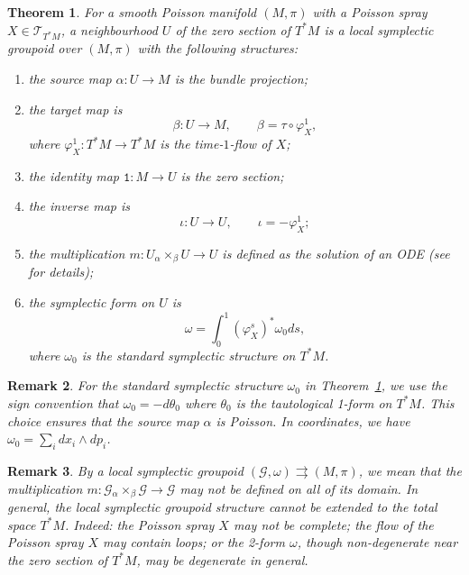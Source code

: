 \documentclass{amsart}
\newtheorem{theorem}{Theorem}[section]
\newtheorem{remark}[theorem]{Remark}
\numberwithin{equation}{section}
\newcommand{\cG}{\mathcal{G}}
\newcommand{\cT}{\mathcal{T}}
\newcommand{\rra}{\rightrightarrows}
\begin{document}
\begin{theorem} 
  \cite{MR2900786, CMS17} 
  \label{thm:poissp}
  For a smooth Poisson manifold $(M, \pi)$ with a Poisson spray $X \in \cT_{T^*M}$, a neighbourhood $U$ of the zero section of $T^*M$ is a local symplectic groupoid over $(M, \pi)$ with the following structures:
  \begin{enumerate}
    \item the source map $\alpha: U \to M$ is the bundle projection;
    \item the target map is
      \[\beta: U \to M, \qquad \beta = \tau \circ \varphi_X^1,\]
      where $\varphi_X^1: T^*M \to T^*M$ is the time-$1$-flow of $X$;
	\item the identity map $\mathtt{1}: M \to U$ is the zero section;
    \item the inverse map is
      \[\iota: U \to U, \qquad \iota = -\varphi_X^1;\]
    \item the multiplication $m: U {_\alpha \times_\beta} U \to U$ is defined as the solution of an ODE (see \cite{CMS17} for details);
    \item the symplectic form on $U$ is
      \[\omega = \int_{0}^{1} (\varphi_X^s)^*\omega_0 ds,\]
      where $\omega_0$ is the standard symplectic structure on $T^*M$.
  \end{enumerate}
\end{theorem}

\begin{remark}
For the standard symplectic structure $\omega_0$ in Theorem~\ref{thm:poissp}, we use the sign convention that $\omega_0 = - d \theta_0$ where $\theta_0$ is the tautological 1-form on $T^*M$. This choice ensures that the source map $\alpha$ is Poisson. In coordinates, we have $\omega_0 = \sum_i d x_i \wedge d p_i$.
\end{remark}

\begin{remark}
By a local symplectic groupoid $(\cG, \omega) \rra (M, \pi)$, we mean that the multiplication $m: \cG {_\alpha \times_\beta} \cG \to \cG$ may not be defined on all of its domain. In general, the local symplectic groupoid structure cannot be extended to the total space $T^*M$. Indeed: the Poisson spray $X$ may not be complete; the flow of the Poisson spray $X$ may contain loops; or the 2-form $\omega$, though non-degenerate near the zero section of $T^*M$, may be degenerate in general.
\end{remark}
\end{document}
